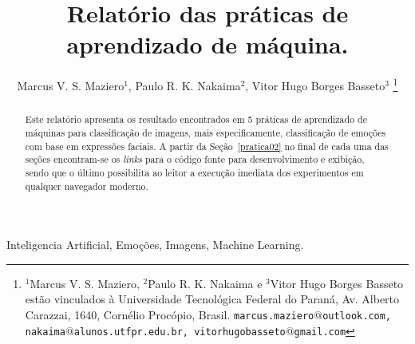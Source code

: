 \documentclass[a4paper, 12 pt, conference]{ieeeconf}  %
\title{\LARGE \bf
Relatório das práticas de aprendizado de máquina.
}
\author{Marcus V. S. Maziero$^{1}$, Paulo R. K. Nakaima$^{2}$, Vitor Hugo Borges Basseto$^{3}$%
\thanks{$^{1}$Marcus V. S. Maziero, $^{2}$Paulo R. K. Nakaima e $^{3}$Vitor Hugo Borges Basseto estão vinculados à Universidade Tecnológica Federal do Paraná, Av. Alberto Carazzai, 1640, Cornélio Procópio, Brasil. 
        {\tt\small marcus.maziero$@$outlook.com, nakaima$@$alunos.utfpr.edu.br, vitorhugobasseto$@$gmail.com}}%
}
\begin{document}
\maketitle
\thispagestyle{empty}
\pagestyle{empty}

\begin{abstract}
	Este relatório apresenta os resultado encontrados em 5 práticas de aprendizado de máquinas para classificação de imagens, mais especificamente, classificação de emoções com base em expressões faciais. A partir da Seção~\ref{pratica02} no final de cada uma das seções encontram-se os \textit{links} para o código fonte para desenvolvimento e exibição, sendo que o último possibilita ao leitor a execução imediata dos experimentos em qualquer navegador moderno.
\end{abstract}

\begin{keywords}
	Inteligencia Artificial, Emoções, Imagens, Machine Learning.
\end{keywords}


%
%
%
%
\end{document}
